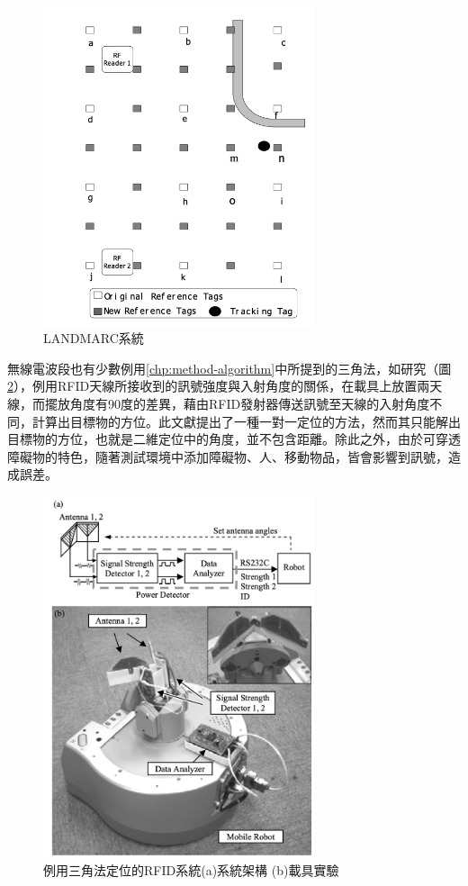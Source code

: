         \begin{figure}[ht]
            \centering
            \includegraphics[width=8cm]{ch2pic/landmarc.png}
            \caption{LANDMARC系統\cite{landmarc}}
            \label{pic:landmarc}
        \end{figure}

        無線電波段也有少數例用\ref{chp:method-algorithm}中所提到的三角法，如\cite{case:rfid_1to1}研究（圖\ref{pic:rfid_1to1}），例用RFID天線所接收到的訊號強度與入射角度的關係，在載具上放置兩天線，而擺放角度有90度的差異，藉由RFID發射器傳送訊號至天線的入射角度不同，計算出目標物的方位。此文獻提出了一種一對一定位的方法，然而其只能解出目標物的方位，也就是二維定位中的角度，並不包含距離。除此之外，由於可穿透障礙物的特色，隨著測試環境中添加障礙物、人、移動物品，皆會影響到訊號，造成誤差。

        \begin{figure}[ht]
            \centering
            \includegraphics[width=8cm]{ch2pic/rfid_1to1.png}
            \caption{例用三角法定位的RFID系統\cite{case:rfid_1to1}(a)系統架構 (b)載具實驗}
            \label{pic:rfid_1to1}
        \end{figure}
        
